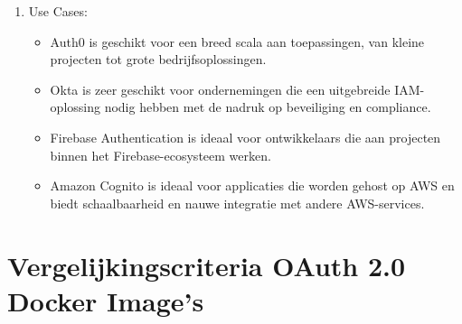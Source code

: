 \begin{enumerate}
  \item Use Cases:
  \begin{itemize}
    \item Auth0 is geschikt voor een breed scala aan toepassingen, van kleine projecten tot grote bedrijfsoplossingen.
    \item Okta is zeer geschikt voor ondernemingen die een uitgebreide IAM-oplossing nodig hebben met de nadruk op beveiliging en compliance.
    \item Firebase Authentication is ideaal voor ontwikkelaars die aan projecten binnen het Firebase-ecosysteem werken.
    \item Amazon Cognito is ideaal voor applicaties die worden gehost op AWS en biedt schaalbaarheid en nauwe integratie met andere AWS-services.
  \end{itemize}
\end{enumerate}



\section{Vergelijkingscriteria OAuth 2.0 Docker Image's}%
\label{sec:vergelijkingscriteria-oauth2-docker-image}

